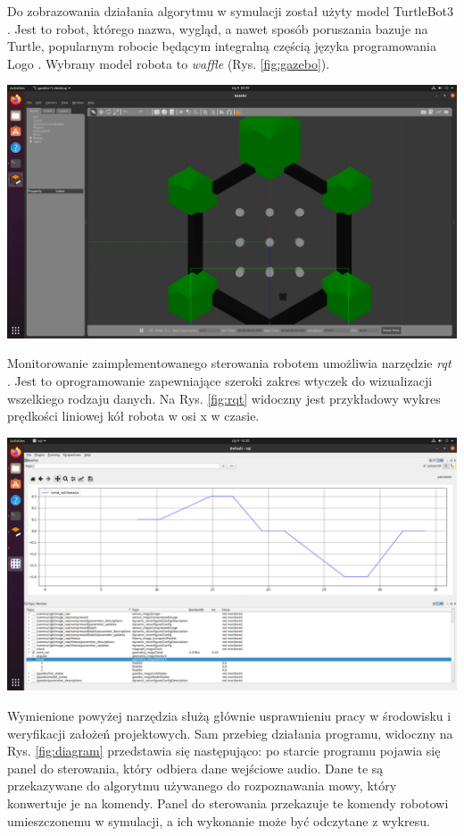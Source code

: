 Do zobrazowania działania algorytmu w symulacji został użyty model TurtleBot3 \cite{turtlebot}. Jest to robot, którego nazwa, wygląd, a nawet sposób poruszania bazuje na Turtle, popularnym robocie będącym integralną częścią języka programowania Logo \cite{logo}. Wybrany model robota to \textit{waffle} (Rys. \ref{fig:gazebo}).

\begin{center}
    \includegraphics[width=0.8\linewidth]{files/gazebo.png}
    \label{fig:gazebo}
\end{center}

Monitorowanie zaimplementowanego sterowania robotem umożliwia narzędzie \textit{rqt} \cite{rqt}. Jest to oprogramowanie zapewniające szeroki zakres wtyczek do wizualizacji wszelkiego rodzaju danych. Na Rys. \ref{fig:rqt} widoczny jest przykładowy wykres prędkości liniowej kół robota w osi x w czasie. 

\begin{center}
    \includegraphics[width=0.8\linewidth]{files/rqt_view.png}
    \label{fig:rqt}
\end{center}

Wymienione powyżej narzędzia służą głównie usprawnieniu pracy w środowisku i weryfikacji założeń projektowych. Sam przebieg działania programu, widoczny na Rys. \ref{fig:diagram} przedstawia się następująco: po starcie programu pojawia się panel do sterowania, który odbiera dane wejściowe audio. Dane te są przekazywane do algorytmu używanego do rozpoznawania mowy, który konwertuje je na komendy. Panel do sterowania przekazuje te komendy robotowi umieszczonemu w symulacji, a ich wykonanie może być odczytane z wykresu.

